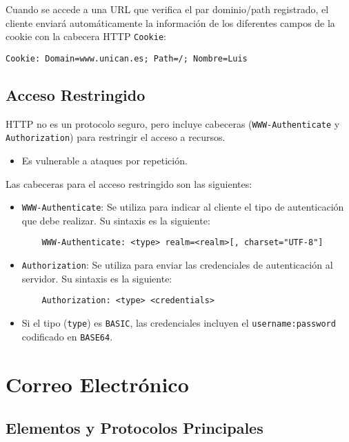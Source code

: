 \documentclass[a4paper,12pt]{article}
\begin{document}
Cuando se accede a una URL que verifica el par dominio/path registrado, el cliente enviará automáticamente la información de los diferentes campos de la cookie con la cabecera HTTP \texttt{Cookie}:

\begin{verbatim}
Cookie: Domain=www.unican.es; Path=/; Nombre=Luis
\end{verbatim}

\subsection{Acceso Restringido}

HTTP no es un protocolo seguro, pero incluye cabeceras (\texttt{WWW-Authenticate} y \texttt{Authorization}) para restringir el acceso a recursos.

\begin{itemize}
    \item Es vulnerable a ataques por repetición.
\end{itemize}

Las cabeceras para el acceso restringido son las siguientes:

\begin{itemize}
    \item \texttt{WWW-Authenticate}: Se utiliza para indicar al cliente el tipo de autenticación que debe realizar. Su sintaxis es la siguiente:
    \begin{verbatim}
    WWW-Authenticate: <type> realm=<realm>[, charset="UTF-8"]
    \end{verbatim}
    \item \texttt{Authorization}: Se utiliza para enviar las credenciales de autenticación al servidor. Su sintaxis es la siguiente:
    \begin{verbatim}
    Authorization: <type> <credentials>
    \end{verbatim}
    \item Si el tipo (\texttt{type}) es \texttt{BASIC}, las credenciales incluyen el \texttt{username:password} codificado en \texttt{BASE64}.
\end{itemize}


\section{Correo Electrónico}


\subsection{Elementos y Protocolos Principales}
\end{document}
